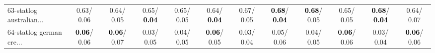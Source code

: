 \begin{table}[h]
\begin{center}
{\begin{tabular}{lc|c|c|c|c|c|c|c|c|c|c}
63-statlog australian... &   0.63/  0.06 &   0.64/  0.05 &   0.65/\textcolor{black}{\textbf{  0.04}} &   0.65/  0.05 &   0.64/\textcolor{black}{\textbf{  0.04}} &   0.67/  0.05 & \textcolor{black}{\textbf{  0.68}}/\textcolor{black}{\textbf{  0.04}} & \textcolor{black}{\textbf{  0.68}}/  0.05 &   0.65/  0.05 & \textcolor{black}{\textbf{  0.68}}/\textcolor{black}{\textbf{  0.04}} &   0.64/  0.07 \\
64-statlog german cre... & \textcolor{black}{\textbf{  0.06}}/  0.06 & \textcolor{black}{\textbf{  0.06}}/  0.07 &   0.03/  0.05 &   0.04/  0.05 & \textcolor{black}{\textbf{  0.06}}/  0.05 &   0.03/  0.04 &   0.05/  0.06 &   0.04/  0.05 & \textcolor{black}{\textbf{  0.06}}/  0.06 &   0.03/  0.04 & \textcolor{black}{\textbf{  0.06}}/  0.06 \\\end{tabular}
}\label{strats1aNB}
\end{center}
\end{table}
